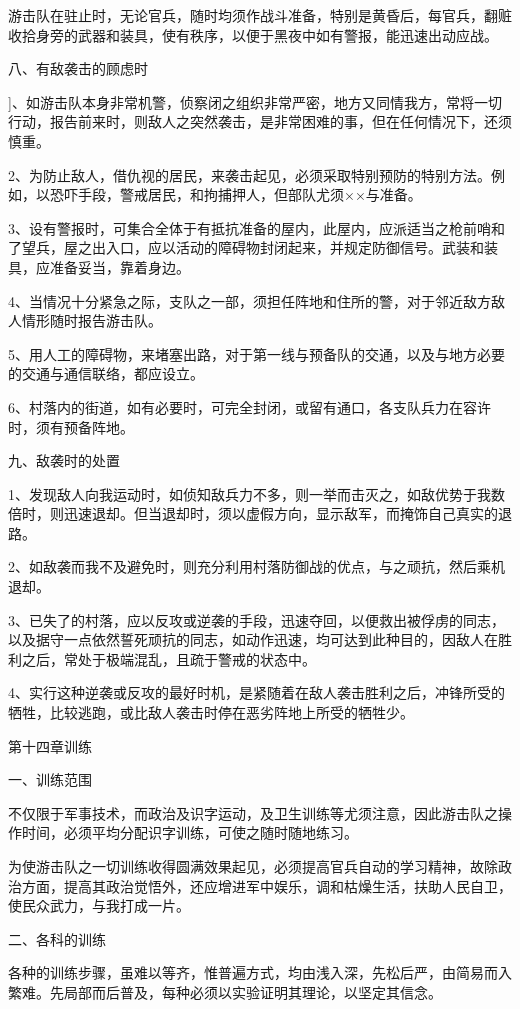 游击队在驻止时，无论官兵，随时均须作战斗准备，特别是黄昏后，每官兵，翻赃收拾身旁的武器和装具，使有秩序，以便于黑夜中如有警报，能迅速出动应战。

八、有敌袭击的顾虑时

]、如游击队本身非常机警，侦察闭之组织非常严密，地方又同情我方，常将一切行动，报告前来时，则敌人之突然袭击，是非常困难的事，但在任何情况下，还须慎重。

2、为防止敌人，借仇视的居民，来袭击起见，必须采取特别预防的特别方法。例如，以恐吓手段，警戒居民，和拘捕押人，但部队尤须××与准备。

3、设有警报时，可集合全体于有抵抗准备的屋内，此屋内，应派适当之枪前哨和了望兵，屋之出入口，应以活动的障碍物封闭起来，并规定防御信号。武装和装具，应准备妥当，靠着身边。

4、当情况十分紧急之际，支队之一部，须担任阵地和住所的警，对于邻近敌方敌人情形随时报告游击队。

5、用人工的障碍物，来堵塞出路，对于第一线与预备队的交通，以及与地方必要的交通与通信联络，都应设立。

6、村落内的街道，如有必要时，可完全封闭，或留有通口，各支队兵力在容许时，须有预备阵地。

九、敌袭时的处置

1、发现敌人向我运动时，如侦知敌兵力不多，则一举而击灭之，如敌优势于我数倍时，则迅速退却。但当退却时，须以虚假方向，显示敌军，而掩饰自己真实的退路。

2、如敌袭而我不及避免时，则充分利用村落防御战的优点，与之顽抗，然后乘机退却。

3、已失了的村落，应以反攻或逆袭的手段，迅速夺回，以便救出被俘虏的同志，以及据守一点依然誓死顽抗的同志，如动作迅速，均可达到此种目的，因敌人在胜利之后，常处于极端混乱，且疏于警戒的状态中。

4、实行这种逆袭或反攻的最好时机，是紧随着在敌人袭击胜利之后，冲锋所受的牺牲，比较逃跑，或比敌人袭击时停在恶劣阵地上所受的牺牲少。

第十四章训练

一、训练范围

不仅限于军事技术，而政治及识字运动，及卫生训练等尤须注意，因此游击队之操作时间，必须平均分配识字训练，可使之随时随地练习。

为使游击队之一切训练收得圆满效果起见，必须提高官兵自动的学习精神，故除政治方面，提高其政治觉悟外，还应增进军中娱乐，调和枯燥生活，扶助人民自卫，使民众武力，与我打成一片。

二、各科的训练

各种的训练步骤，虽难以等齐，惟普遍方式，均由浅入深，先松后严，由简易而入繁难。先局部而后普及，每种必须以实验证明其理论，以坚定其信念。

